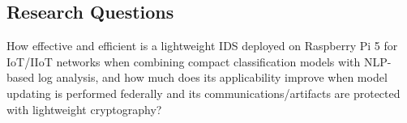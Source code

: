 \subsection{Research Questions}
How effective and efficient is a lightweight IDS deployed on Raspberry Pi 5 for IoT/IIoT networks when combining compact classification models with NLP-based log analysis, and how much does its applicability improve when model updating is performed federally and its communications/artifacts are protected with lightweight cryptography?
